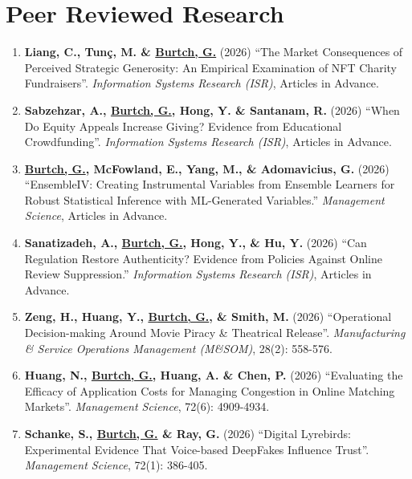 \documentclass[10.5pt,letterpaper,sans]{moderncv}        %
\begin{document}
\vspace{8 pt}

\section{Peer Reviewed Research}

\smallskip

\begin{enumerate}[leftmargin=!,labelindent=5pt,itemindent=-15pt]

\item \textbf{Liang, C., Tun\c{c}, M. \& \underline{Burtch, G.}} (2026) ``The Market Consequences of Perceived Strategic Generosity: An Empirical Examination of NFT Charity Fundraisers''. \textit{Information Systems Research (ISR)}, Articles in Advance.

\item \textbf{Sabzehzar, A., \underline{Burtch, G.}, Hong, Y. \& Santanam, R.} (2026) ``When Do Equity Appeals Increase Giving? Evidence from Educational Crowdfunding''. \textit{Information Systems Research (ISR)}, Articles in Advance.

\item \textbf{\underline{Burtch, G.}, McFowland, E., Yang, M., \& Adomavicius, G.} (2026) ``EnsembleIV: Creating Instrumental Variables from Ensemble Learners for Robust Statistical Inference with ML-Generated Variables.'' \textit{Management Science}, Articles in Advance.

\item \textbf{Sanatizadeh, A., \underline{Burtch, G.}, Hong, Y., \& Hu, Y.} (2026) ``Can Regulation Restore Authenticity? Evidence from Policies Against Online Review Suppression.'' \textit{Information Systems Research (ISR)}, Articles in Advance.

\item \textbf{Zeng, H., Huang, Y., \underline{Burtch, G.}, \& Smith, M.} (2026) ``Operational Decision-making Around Movie Piracy \& Theatrical Release''. \textit{Manufacturing \& Service Operations Management (M\&SOM)}, 28(2): 558-576.

\item \textbf{Huang, N., \underline{Burtch, G.}, Huang, A. \& Chen, P.} (2026) ``Evaluating the Efficacy of Application Costs for Managing Congestion in Online Matching Markets''. \textit{Management Science}, 72(6): 4909-4934.

\item \textbf{Schanke, S.,  \underline{Burtch, G.} \& Ray, G.} (2026) ``Digital Lyrebirds: Experimental Evidence That Voice-based DeepFakes Influence Trust''. \textit{Management Science}, 72(1): 386-405.


\end{enumerate}
\end{document}
